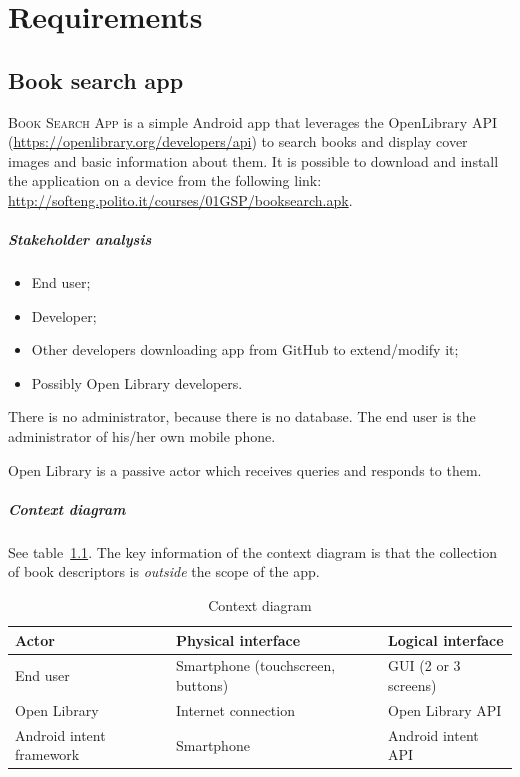 \chapter{Requirements}
\section{Book search app}
\textsc{Book Search App} is a simple Android app that leverages the OpenLibrary API (\url{https://openlibrary.org/developers/api}) to search books and display cover images and basic information about them. It is possible to download and install the application on a device from the following link: \url{http://softeng.polito.it/courses/01GSP/booksearch.apk}.

\paragraph{Stakeholder analysis}
\begin{itemize}
\item End user;
\item Developer;
\item Other developers downloading app from GitHub to extend/modify it;
\item Possibly Open Library developers.
\end{itemize}
There is no administrator, because there is no database. The end user is the administrator of his/her own mobile phone.

Open Library is a passive actor which receives queries and responds to them.

\paragraph{Context diagram} See table~\ref{tab:book_context}. The key information of the context diagram is that the collection of book descriptors is \emph{outside} the scope of the app.

\begin{table}
\centering
\footnotesize
\begin{tabular}{|l|l|l|}
\hline
\textbf{Actor} & \textbf{Physical interface} & \textbf{Logical interface} \\
\hline
End user & Smartphone (touchscreen, buttons) & GUI (2 or 3 screens) \\
\hline
Open Library & Internet connection & Open Library API \\
\hline
Android intent framework & Smartphone & Android intent API \\
\hline
\end{tabular}
\caption{Context diagram}
\label{tab:book_context}
\end{table}

